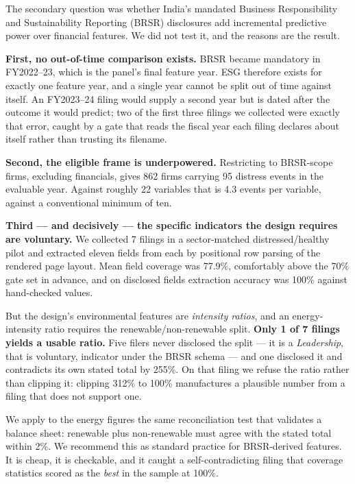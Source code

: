 \documentclass[conference]{IEEEtran}
\begin{document}
The secondary question was whether India's mandated Business Responsibility and
Sustainability Reporting (BRSR) disclosures add incremental predictive power
over financial features. We did not test it, and the reasons are the result.

\textbf{First, no out-of-time comparison exists.} BRSR became mandatory in
FY2022--23, which is the panel's final feature year. ESG therefore exists for
exactly one feature year, and a single year cannot be split out of time against
itself. An FY2023--24 filing would supply a second year but is dated after the
outcome it would predict; two of the first three filings we collected were
exactly that error, caught by a gate that reads the fiscal year each filing
declares about itself rather than trusting its filename.

\textbf{Second, the eligible frame is underpowered.} Restricting to BRSR-scope
firms, excluding financials, gives 862 firms carrying 95 distress events in
the evaluable year. Against roughly 22 variables that is 4.3 events per
variable, against a conventional minimum of ten.

\textbf{Third --- and decisively --- the specific indicators the design requires
are voluntary.} We collected 7 filings in a sector-matched
distressed/healthy pilot and extracted eleven fields from each by positional
row parsing of the rendered page layout. Mean field coverage was 77.9\%,
comfortably above the 70\% gate set in advance, and on disclosed fields
extraction accuracy was 100\% against hand-checked values.

But the design's environmental features are \emph{intensity ratios}, and an
energy-intensity ratio requires the renewable/non-renewable split.
\textbf{Only 1 of 7 filings yields a usable ratio.} Five filers never
disclosed the split --- it is a \emph{Leadership}, that is voluntary,
indicator under the BRSR schema --- and one disclosed it and contradicts its
own stated total by 255\%. On that filing we refuse the ratio rather than
clipping it: clipping 312\% to 100\% manufactures a plausible number from a
filing that does not support one.

We apply to the energy figures the same reconciliation test that validates a
balance sheet: renewable plus non-renewable must agree with the stated total
within 2\%. We recommend this as standard practice for BRSR-derived features.
It is cheap, it is checkable, and it caught a self-contradicting filing that
coverage statistics scored as the \emph{best} in the sample at 100\%.
\end{document}
